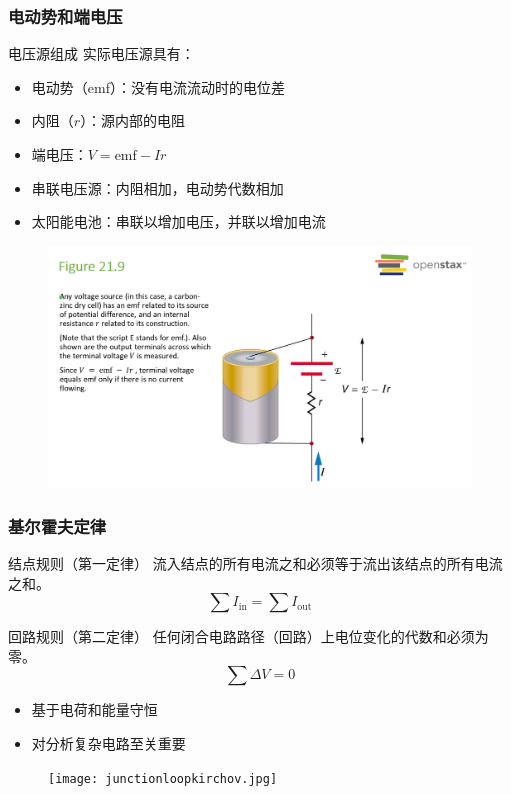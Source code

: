 \documentclass{beamer}
\begin{document}
\begin{frame}
    \frametitle{电动势和端电压}
    \begin{block}{电压源组成}
        实际电压源具有：
        \begin{itemize}
            \item 电动势（emf）：没有电流流动时的电位差
            \item 内阻（$r$）：源内部的电阻
        \end{itemize}
    \end{block}
    \begin{itemize}
        \item 端电压：$V = \text{emf} - Ir$
        \item 串联电压源：内阻相加，电动势代数相加
        \item 太阳能电池：串联以增加电压，并联以增加电流
    \end{itemize}
\end{frame}
\begin{frame}
    \begin{figure}
        \centering
        \includegraphics[width=1\linewidth]{inres.png}
    \end{figure}
\end{frame}
\begin{frame}
    \frametitle{基尔霍夫定律}
    \begin{block}{结点规则（第一定律）}
        流入结点的所有电流之和必须等于流出该结点的所有电流之和。
        \[ \sum I_{\text{in}} = \sum I_{\text{out}} \]
    \end{block}
    \begin{block}{回路规则（第二定律）}
        任何闭合电路路径（回路）上电位变化的代数和必须为零。
        \[ \sum \Delta V = 0 \]
    \end{block}
    \begin{itemize}
        \item 基于电荷和能量守恒
        \item 对分析复杂电路至关重要
    \end{itemize}
\end{frame}
\begin{frame}{}
    \begin{figure}
        \centering
        \texttt{[image: junctionloopkirchov.jpg]}
    \end{figure}
\end{frame}
\end{document}
